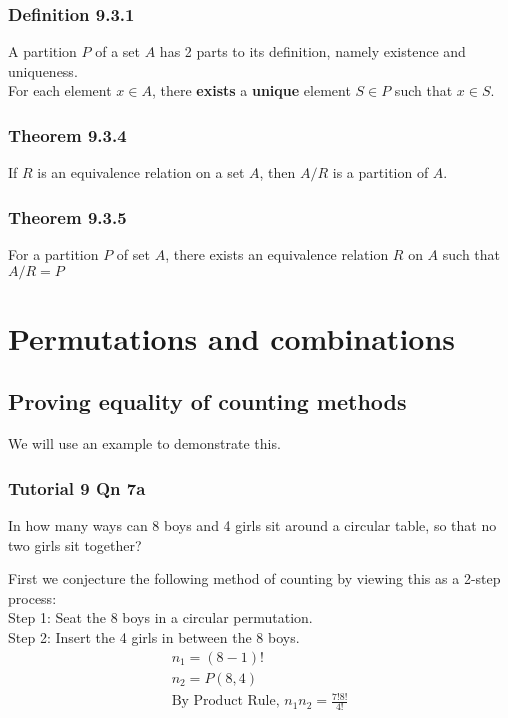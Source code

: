 \documentclass{article}
\begin{document}
\subsubsection{Definition 9.3.1}
A partition $P$ of a set $A$ has 2 parts to its definition, namely existence and uniqueness.\\ 
For each element $x\in A$, there \textbf{exists} a \textbf{unique} element $S\in P$ such that $x\in S$.

\subsubsection{Theorem 9.3.4}
If $R$ is an equivalence relation on a set $A$, then $A/R$ is a partition of $A$.

\subsubsection{Theorem 9.3.5}
For a partition $P$ of set $A$, there exists an equivalence relation $R$ on $A$ such that $A/R=P$

\section{Permutations and combinations}
\subsection{Proving equality of counting methods}
We will use an example to demonstrate this.
\subsubsection{Tutorial 9 Qn 7a}
In how many ways can 8 boys and 4 girls sit around a circular table, so that no two girls sit together?

First we conjecture the following method of counting by viewing this as a 2-step process:\\
Step 1: Seat the 8 boys in a circular permutation.\\
Step 2: Insert the 4 girls in between the 8 boys.
\begin{align*}
    n_1=(8-1)!\\
    n_2=P(8,4)\\
    \text{By Product Rule, } n_1n_2=\frac{7!8!}{4!}
\end{align*}
\end{document}
